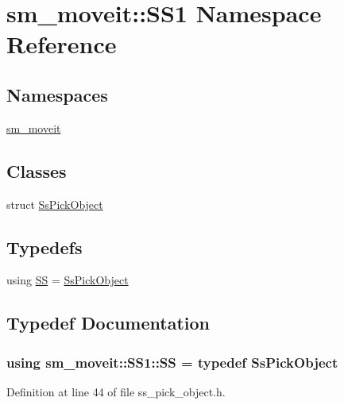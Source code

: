 \hypertarget{namespacesm__moveit_1_1SS1}{}\section{sm\+\_\+moveit\+:\+:S\+S1 Namespace Reference}
\label{namespacesm__moveit_1_1SS1}
\subsection*{Namespaces}
\begin{DoxyCompactItemize}
\item 
 \hyperlink{namespacesm__moveit_1_1SS1_1_1sm__moveit}{sm\+\_\+moveit}
\end{DoxyCompactItemize}
\subsection*{Classes}
\begin{DoxyCompactItemize}
\item 
struct \hyperlink{structsm__moveit_1_1SS1_1_1SsPickObject}{Ss\+Pick\+Object}
\end{DoxyCompactItemize}
\subsection*{Typedefs}
\begin{DoxyCompactItemize}
\item 
using \hyperlink{namespacesm__moveit_1_1SS1_a82919e558782e44b5fbfed9a58db5203}{SS} = \hyperlink{structsm__moveit_1_1SS1_1_1SsPickObject}{Ss\+Pick\+Object}
\end{DoxyCompactItemize}


\subsection{Typedef Documentation}
\subsubsection[{\texorpdfstring{SS}{SS}}]{\setlength{\rightskip}{0pt plus 5cm}using {\bf sm\+\_\+moveit\+::\+S\+S1\+::\+SS} = typedef {\bf Ss\+Pick\+Object}}\hypertarget{namespacesm__moveit_1_1SS1_a82919e558782e44b5fbfed9a58db5203}{}\label{namespacesm__moveit_1_1SS1_a82919e558782e44b5fbfed9a58db5203}


Definition at line 44 of file ss\+\_\+pick\+\_\+object.\+h.


